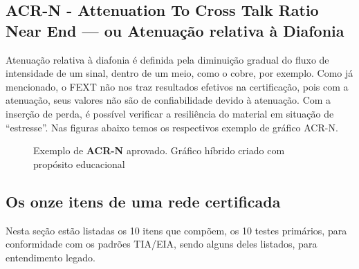 \documentclass[	DIV=calc,%
							paper=a4,%
							fontsize=12pt,%
							onecolumn]{scrartcl}	 					%
\begin{document}
\subsection{ACR-N - Attenuation To Cross Talk Ratio Near End --- ou Atenuação relativa à Diafonia}
Atenuação relativa à diafonia é definida pela diminuição gradual do fluxo de intensidade de um sinal, dentro de um meio, como o cobre, por exemplo. Como já mencionado, o FEXT não nos traz resultados efetivos na certificação, pois com a atenuação, seus valores não são de confiabilidade devido à atenuação. Com a inserção de perda, é possível verificar a resiliência do material em situação de ``estresse''. Nas figuras abaixo temos os respectivos exemplo de gráfico ACR-N.

\begin{figure}[H]
	\noindent{}
	\caption{Exemplo de \textbf{ACR-N} aprovado. Gráfico híbrido criado com propósito educacional \cite{acr}}
	\label{fig5}
\end{figure}


\subsection{Os onze itens de uma rede certificada}
Nesta seção estão listadas os 10 itens que compõem, os 10 testes primários, para conformidade com os padrões TIA/EIA, sendo alguns deles listados, para entendimento legado.
\end{document}
